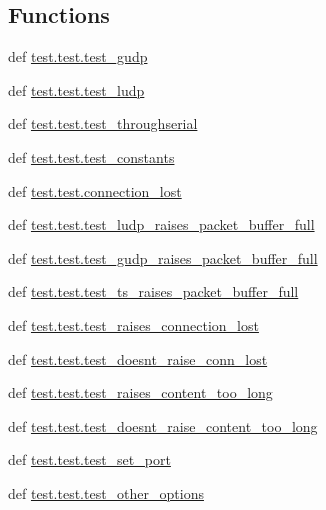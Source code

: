 \subsection*{Functions}
\begin{DoxyCompactItemize}
\item 
def \hyperlink{namespacetest_1_1test_affc6581508551ad868ceda18f3ab2fbf}{test.\-test.\-test\-\_\-gudp}
\item 
def \hyperlink{namespacetest_1_1test_a94842839efe3b21022d22c6d47431d67}{test.\-test.\-test\-\_\-ludp}
\item 
def \hyperlink{namespacetest_1_1test_ae570fd9dc22c325678df9950f727ded1}{test.\-test.\-test\-\_\-throughserial}
\item 
def \hyperlink{namespacetest_1_1test_a222a5aa76c6b269e6823e72363a9e69d}{test.\-test.\-test\-\_\-constants}
\item 
def \hyperlink{namespacetest_1_1test_a3e5587e440ee60bd9e9f026957ef53ac}{test.\-test.\-connection\-\_\-lost}
\item 
def \hyperlink{namespacetest_1_1test_a9cb9923443838439fa3c1edaf2e41d7a}{test.\-test.\-test\-\_\-ludp\-\_\-raises\-\_\-packet\-\_\-buffer\-\_\-full}
\item 
def \hyperlink{namespacetest_1_1test_a8d40e34845a7b08c61a750347b865f9c}{test.\-test.\-test\-\_\-gudp\-\_\-raises\-\_\-packet\-\_\-buffer\-\_\-full}
\item 
def \hyperlink{namespacetest_1_1test_aa397c85b079a5f08e9b1a09039f40faa}{test.\-test.\-test\-\_\-ts\-\_\-raises\-\_\-packet\-\_\-buffer\-\_\-full}
\item 
def \hyperlink{namespacetest_1_1test_aed702642c8e3b1885dac071ce468d5a6}{test.\-test.\-test\-\_\-raises\-\_\-connection\-\_\-lost}
\item 
def \hyperlink{namespacetest_1_1test_a441032bdc393a2f97e8fbb3d07134c38}{test.\-test.\-test\-\_\-doesnt\-\_\-raise\-\_\-conn\-\_\-lost}
\item 
def \hyperlink{namespacetest_1_1test_af224357bfb87689b347e0c327003f57c}{test.\-test.\-test\-\_\-raises\-\_\-content\-\_\-too\-\_\-long}
\item 
def \hyperlink{namespacetest_1_1test_a88e12fed24f36a84259697070da90175}{test.\-test.\-test\-\_\-doesnt\-\_\-raise\-\_\-content\-\_\-too\-\_\-long}
\item 
def \hyperlink{namespacetest_1_1test_a54f6072931b2dba1033e696e968b03d4}{test.\-test.\-test\-\_\-set\-\_\-port}
\item 
def \hyperlink{namespacetest_1_1test_a5add99ae69fd7c723730a548a73b61d9}{test.\-test.\-test\-\_\-other\-\_\-options}

\end{DoxyCompactItemize}
